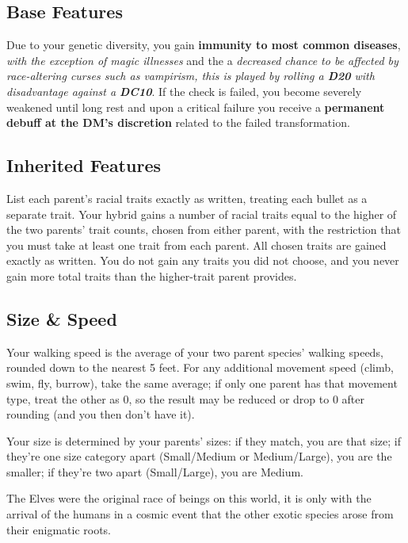 \documentclass{apotheosis-book}
\begin{document}
\subsection{Base Features}
Due to your genetic diversity, you gain \textbf{immunity to most common diseases},\textit{ with the exception of magic illnesses} and the a \textit{decreased chance to be affected by race-altering curses such as vampirism, this is played by rolling a \textbf{D20} with disadvantage against a \textbf{DC10}}. If the check is failed, you become severely weakened until long rest and upon a critical failure you receive a \textbf{permanent debuff at the DM's discretion} related to the failed transformation.

\subsection{Inherited Features}
List each parent’s racial traits exactly as written, treating each bullet as a separate trait. Your hybrid gains a number of racial traits equal to the higher of the two parents’ trait counts, chosen from either parent, with the restriction that you must take at least one trait from each parent. All chosen traits are gained exactly as written. You do not gain any traits you did not choose, and you never gain more total traits than the higher-trait parent provides.

\subsection{Size \& Speed}
Your walking speed is the average of your two parent species' walking speeds, rounded down to the nearest 5 feet. For any additional movement speed (climb, swim, fly, burrow), take the same average; if only one parent has that movement type, treat the other as 0, so the result may be reduced or drop to 0 after rounding (and you then don't have it).

Your size is determined by your parents' sizes: if they match, you are that size; if they're one size category apart (Small/Medium or Medium/Large), you are the smaller; if they're two apart (Small/Large), you are Medium.

\begin{DndReadAloud}
   The Elves were the original race of beings on this world, it is only with the arrival of the humans in a cosmic event that the other exotic species arose from their enigmatic roots.
\end{DndReadAloud}
\end{document}
